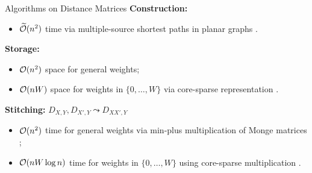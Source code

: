 \documentclass[sans-serif,aspectratio=169]{beamer}
\begin{document}
\begin{frame}
\begin{columns}
\begin{column}{.5\textwidth}
\begin{center}
    \end{center}
  \end{column}%
\end{columns}%

\end{frame}


\begin{frame}{Algorithms on Distance Matrices}
    \textbf{Construction:}
    \begin{itemize}
        \item  $\widetilde{\mathcal{O}}(n^2)$ time via multiple-source shortest paths in planar graphs .
    \end{itemize}

    \pause

    \bigskip

    \textbf{Storage:} 

    \begin{itemize}
        \item  $\mathcal{O}(n^2)$ space for general weights;
        \item  $\mathcal{O}(nW)$ space for weights in $\{0,\ldots,W\}$ via core-sparse representation .
    \end{itemize}

    \pause

    \bigskip

    \textbf{Stitching:} $D_{X,Y}, D_{X',Y} \leadsto D_{XX',Y}$

    \begin{itemize}
        \item  $\mathcal{O}(n^2)$ time for general weights via min-plus multiplication of Monge matrices ;
        \item  $\mathcal{O}(nW\log n)$ time for weights in $\{0,\ldots,W\}$ using core-sparse multiplication .
    \end{itemize}

\end{frame}
\end{document}
